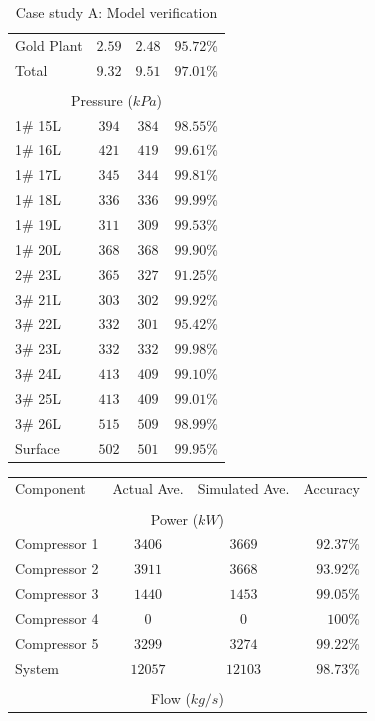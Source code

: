 \begin{appendices}
\begin{table}[h!]
\begin{tabular}{lccr}
		Gold Plant & $ 2.59 $ & $ 2.48 $ & $ 95.72 $\% \\
		Total  	 & $ 9.32$  & $9.51 $  & $ 97.01 $\% \\
		\\
		\multicolumn{4}{c}{Pressure ($ kPa $)}
		\\
		1\# 15L  & $ 394 $ & $ 384 $ & $ 98.55 $\% \\
		1\# 16L  & $ 421 $ & $ 419 $ & $ 99.61 $\% \\
		1\# 17L  & $ 345 $ & $ 344 $ & $ 99.81 $\% \\
		1\# 18L  & $ 336 $ & $ 336 $ & $ 99.99 $\% \\
		1\# 19L  & $ 311 $ & $ 309 $ & $ 99.53 $\% \\
		1\# 20L  & $ 368 $ & $ 368 $ & $ 99.90 $\% \\
		2\# 23L  & $ 365 $ & $ 327 $ & $ 91.25 $\% \\
		3\# 21L  & $ 303 $ & $ 302 $ & $ 99.92 $\% \\
		3\# 22L  & $ 332 $ & $ 301 $ & $ 95.42 $\% \\
		3\# 23L  & $ 332 $ & $ 332 $ & $ 99.98 $\% \\
		3\# 24L  & $ 413 $ & $ 409 $ & $ 99.10 $\% \\
		3\# 25L  & $ 413 $ & $ 409 $ & $ 99.01 $\% \\
		3\# 26L  & $ 515 $ & $ 509 $ & $ 98.99 $\% \\
		Surface & $ 502 $ & $ 501 $ & $ 99.95 $\% \\
		\hline 
	\end{tabular}
\caption{Case study A: Model verification}
\label{Table: A verification}
\end{table}

\newpage
\begin{table}[h!]
	\centering
	\begin{tabular}{lccr}
		\hline 
		Component & Actual Ave. & Simulated  Ave. & Accuracy \\ \hhline{====} 
		\\
		\multicolumn{4}{c}{Power ($ kW $)}
		\\
		Compressor 1 & $ 3406 $ & $ 3669 $ & $ 92.37 $\% \\
		Compressor 2 & $ 3911 $ & $ 3668 $ & $ 93.92 $\% \\
		Compressor 3 & $ 1440 $ & $ 1453 $ & $ 99.05 $\% \\
		Compressor 4 & $  0   $ & $  0   $ & $ 100   $\% \\
		Compressor 5 & $ 3299 $ & $ 3274 $ & $ 99.22 $\% \\
		System       & $12057 $ & $12103 $ & $ 98.73 $\% \\
		\\
		\multicolumn{4}{c}{Flow ($ kg/s $)}
		\\
		

\end{tabular}
\end{table}
\end{appendices}

